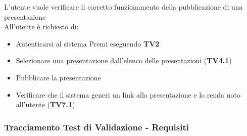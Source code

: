 L'utente vuole verificare il corretto funzionamento della pubblicazione di una presentazione\\
All'utente è richiesto di:

\begin{itemize}
	\item Autenticarsi al sistema Premi eseguendo \textbf{TV2}
	\item Selezionare una presentazione dall'elenco delle presentazioni (\textbf{TV4.1})
	\item Pubblicare la presentazione
	\item Verificare che il sistema generi un link alla presentazione e lo renda noto all'utente (\textbf{TV7.1})
\end{itemize}
\newpage
\subsubsection {Tracciamento Test di Validazione - Requisiti}
